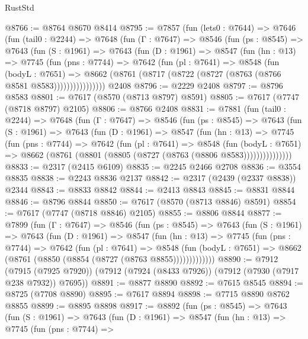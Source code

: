 \begin{lexlean}{RustStd}
\begin{coremodule}
@8766 := @8764 @8670 @8414
@8795 := @7857
    (fun (lets0 : @7644) =>
    @7646
      (fun (tail0 : @2244) =>
      @7648
        (fun (Γ : @7647) =>
        @8546
          (fun (ps : @8545) =>
          @7643
            (fun (S : @1961) =>
            @7643
              (fun (D : @1961) =>
              @8547
                (fun (hn : @13) =>
                @7745
                  (fun (pns : @7744) =>
                  @7642
                    (fun (pl : @7641) =>
                    @8548
                      (fun (bodyL : @7651) =>
                      @8662 (@8761 (@8717 (@8722 (@8727 (@8763 (@8766 @8581 @8583))))))))))))))))
    @2408
@8796 := @2229 @2408
@8797 := @8796 @8583
@8801 := @7617 (@8570 (@8713 @8797) @8591)
@8805 := @7617 (@7747 (@8718 @8797) @2105)
@8806 := @8766 @2408
@8831 := @7881
    (fun (tail0 : @2244) =>
    @7648
      (fun (Γ : @7647) =>
      @8546
        (fun (ps : @8545) =>
        @7643
          (fun (S : @1961) =>
          @7643
            (fun (D : @1961) =>
            @8547
              (fun (hn : @13) =>
              @7745
                (fun (pns : @7744) =>
                @7642
                  (fun (pl : @7641) =>
                  @8548
                    (fun (bodyL : @7651) =>
                    @8662 (@8761 (@8801 (@8805 (@8727 (@8763 (@8806 @8583)))))))))))))))
@8833 := @2317 (@2415 @6109)
@8835 := @2245 @2466 @2708
@8836 := @3554 @8835
@8838 := @2243 @8836 @2137
@8842 := @2317 (@2439 (@2337 @8838)) @2344
@8843 := @8833 @8842
@8844 := @2413 @8843
@8845 := @8831 @8844
@8846 := @8796 @8844
@8850 := @7617 (@8570 (@8713 @8846) @8591)
@8854 := @7617 (@7747 (@8718 @8846) @2105)
@8855 := @8806 @8844
@8877 := @7899
    (fun (Γ : @7647) =>
    @8546
      (fun (ps : @8545) =>
      @7643
        (fun (S : @1961) =>
        @7643
          (fun (D : @1961) =>
          @8547
            (fun (hn : @13) =>
            @7745
              (fun (pns : @7744) =>
              @7642
                (fun (pl : @7641) =>
                @8548
                  (fun (bodyL : @7651) =>
                  @8662 (@8761 (@8850 (@8854 (@8727 (@8763 @8855)))))))))))))
@8890 := @7912
    (@7915 (@7925 @7920))
    (@7912 (@7924 (@8433 @7926)) (@7912 (@7930 (@7917 @238 @7932)) @7695))
@8891 := @8877 @8890
@8892 := @7615 @8545
@8894 := @8725 (@7708 @8890)
@8895 := @7617 @8894
@8898 := @7715 @8890 @8762 @8855
@8899 := @8895 @8898
@8917 := @8892
    (fun (ps : @8545) =>
    @7643
      (fun (S : @1961) =>
      @7643
        (fun (D : @1961) =>
        @8547
          (fun (hn : @13) =>
          @7745
            (fun (pns : @7744) =>

\end{coremodule}
\end{lexlean}

